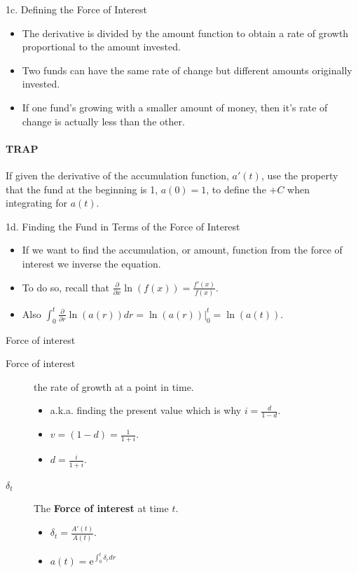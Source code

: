 \begin{CHPT_SUMM_AUTO}[label = {L.-1c}]{1c. Defining the Force of Interest}
	\begin{itemize}[leftmargin = *]
		\item	The derivative is divided by the amount function to obtain a rate of growth proportional to the amount invested.
		\item	Two funds can have the same rate of change but different amounts originally invested.
		\item	If one fund's growing with a smaller amount of money, then it's rate of change is actually less than the other.
	\end{itemize}
	
\paragraph{TRAP} If given the derivative of the accumulation function, $a'(t)$, use the property that the fund at the beginning is 1, $a(0) = 1$, to define the $+ C$ when integrating for $a(t)$.
\end{CHPT_SUMM_AUTO}

\begin{CHPT_SUMM_AUTO}[label = {L.-1d}]{1d. Finding the Fund in Terms of the Force of Interest}
	\begin{itemize}[leftmargin = *]
		\item	If we want to find the accumulation, or amount, function from the force of interest we inverse the equation.
		\item	To do so, recall that $\frac{\partial}{\partial x}\ln(f(x)) = \frac{f'(x)}{f(x)}$.
		\item	Also $\int_{0}^{t} \frac{\partial}{\partial r} \ln(a(r)) dr = 	\ln(a(r))\big|_{0}^{t} =	\ln(a(t))$.
	\end{itemize}
	
\begin{FORMULA_SUMM}{Force of interest}
\begin{description}
	\item[Force of interest]	the rate of growth at a point in time.
		\begin{itemize}[leftmargin = *]
		\item	a.k.a. finding the present value which is why $i = \frac{d}{1 - d}$.
		\item	$v = (1 - d) = \frac{1}{1 + i}$.
		\item	$d = \frac{i}{1 + i}$.
		\end{itemize}
	\item[$\delta_{t}$]	The \textbf{Force of interest} at time $t$.
		\begin{itemize}[leftmargin = *]
		\item	$\delta_{t} = \frac{A'(t)}{A(t)}$.
		\item	$a(t)	=	\textrm{e}^{\int_{0}^{t}\delta_{r}dr}$
		\end{itemize}
\end{description}
\end{FORMULA_SUMM}
\end{CHPT_SUMM_AUTO}

